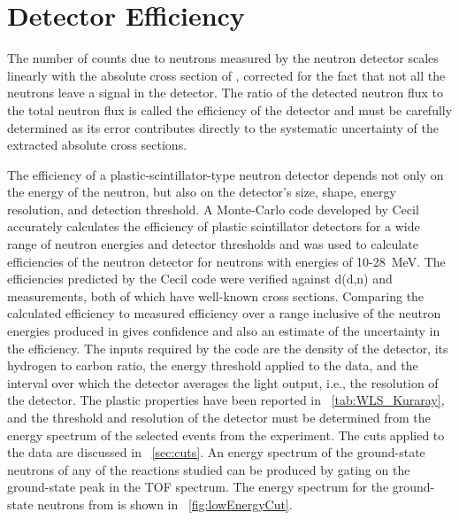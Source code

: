 \section{Detector Efficiency}

\label{sec:efficiency}
The number of counts due to neutrons measured by the neutron detector scales linearly with the absolute cross section of \reaction, corrected for the fact that not all the neutrons leave a signal in the detector.  The ratio of the detected neutron flux to the total neutron flux is called the efficiency of the detector and must be carefully determined as its error contributes directly to the systematic uncertainty of the extracted absolute cross sections.

The efficiency of a plastic-scintillator-type neutron detector depends not only on the energy of the neutron, but also on the detector's size, shape, energy resolution, and detection threshold.  A Monte-Carlo code developed by Cecil \cite{Cecil_neutEfficiency} accurately calculates the efficiency of plastic scintillator detectors for a wide range of neutron energies and detector thresholds and was used to calculate efficiencies of the neutron detector for neutrons with energies of 10-28~MeV.  The efficiencies predicted by the Cecil code were verified against d(d,n) and \MgReaction measurements, both of which have well-known cross sections.  Comparing the calculated efficiency to measured efficiency over a range inclusive of the neutron energies produced in \reaction gives confidence and also an estimate of the uncertainty in the efficiency.  The inputs required by the code are the density of the detector, its hydrogen to carbon ratio, the energy threshold applied to the data, and the interval over which the detector averages the light output, i.e., the resolution of the detector.  The plastic properties have been reported in {\tab}~\ref{tab:WLS_Kuraray}, and the threshold and resolution of the detector must be determined from the energy spectrum of the selected events from the experiment.  The cuts applied to the data are discussed in {\sect}~\ref{sec:cuts}.  An energy spectrum of the ground-state neutrons of any of the reactions studied can be produced by gating on the ground-state peak in the TOF spectrum.  The energy spectrum for the ground-state neutrons from \MgReaction is shown in {\fig}~\ref{fig:lowEnergyCut}. 

